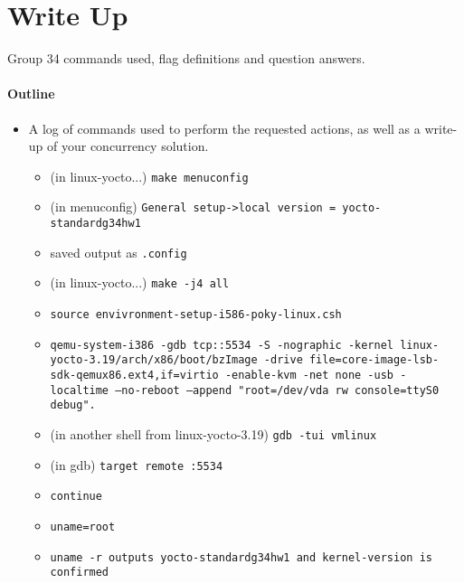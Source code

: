 \documentclass[titlepage]{article}
\begin{document}
\maketitle

\section*{Write Up}
Group 34 commands used, flag definitions and question answers.

\paragraph{Outline}

\begin{itemize}
  \item A log of commands used to perform the requested actions, as well as a write-up of your concurrency solution.
  \begin{itemize}
    \item (in linux-yocto...) \texttt{make menuconfig}
    \item (in menuconfig) \texttt{General setup->local version = yocto-standardg34hw1}
    \item saved output as \texttt{.config}
    \item (in linux-yocto...) \texttt{make -j4 all}
    \item \texttt{source envivronment-setup-i586-poky-linux.csh}
    \item \texttt{qemu-system-i386 -gdb tcp::5534 -S -nographic -kernel linux-yocto-3.19/arch/x86/boot/bzImage -drive file=core-image-lsb-sdk-qemux86.ext4,if=virtio -enable-kvm -net none -usb -localtime --no-reboot --append "root=/dev/vda rw console=ttyS0 debug".}
    \item (in another shell from linux-yocto-3.19) \texttt{gdb -tui vmlinux}
    \item (in gdb) \texttt{target remote :5534}
    \item \texttt{continue}
    \item \texttt{uname=root}
    \item \texttt{uname -r outputs yocto-standardg34hw1 and kernel-version is confirmed}


\end{itemize}
\end{itemize}
\end{document}
